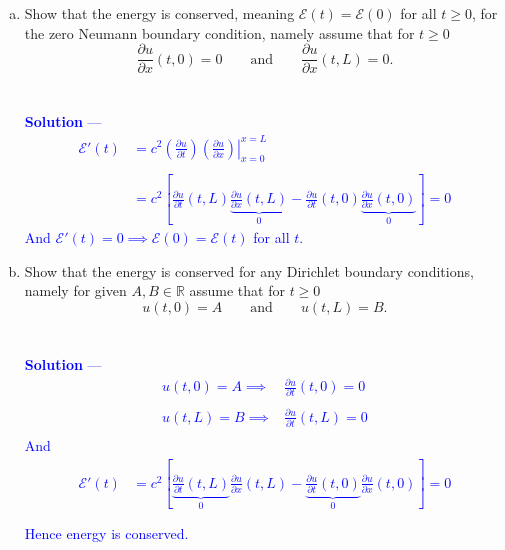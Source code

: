 \documentclass[12pt]{article}
\newcommand{\mcE}{\mathcal{E}}
\begin{document}
\begin{enumerate}[(a)]
\item Show that the energy is conserved, meaning $\mcE(t) = \mcE(0)$ for all $t \geq 0$, for the zero Neumann boundary condition, namely assume that for $t \geq 0$
$$ \frac{\partial u}{\partial x} (t,0) = 0 \qquad \mathrm{and}  \qquad \frac{\partial u}{\partial x} (t,L) = 0.$$ \\ \\ 
\textcolor{blue}{\textbf{Solution} — 
\begin{align*}
\mcE'(t) &= c^2 \left. \left( \frac{\partial u}{\partial t} \right) \left( \frac{\partial u}{\partial x} \right) \right|_{x=0}^{x=L} \\ \\
&=  c^2 \left[ \frac{\partial u}{\partial t} (t, L) \underbrace{\frac{\partial u}{\partial x} (t,L)}_{0} - \frac{\partial u}{\partial t} (t, 0) \underbrace{\frac{\partial u}{\partial x} (t,0)}_{0} \right]  = 0 
\end{align*}
And $\mcE'(t) = 0 \implies \mcE(0) = \mcE(t)$ for all $t$. \\ 
}

\item Show that the energy is conserved for any Dirichlet boundary conditions, namely for given $A,B \in \mathbb{R}$ assume that for $t \geq 0$
$$u(t,0) = A \qquad \mathrm{and} \qquad u(t,L) = B.$$ \\ \\
\textcolor{blue}{\textbf{Solution} — 
\begin{align*}
u(t,0) = A \implies& \frac{\partial u}{\partial t} (t,0) = 0 \\ \\
u(t,L) = B \implies& \frac{\partial u}{\partial t} (t,L) = 0 \\
\end{align*}
And
\begin{align*}
\mcE'(t) &= c^2 \left[ \underbrace{\frac{\partial u}{\partial t} (t, L)}_{0} \frac{\partial u}{\partial x} (t,L) - \underbrace{\frac{\partial u}{\partial t} (t, 0)}_{0} \frac{\partial u}{\partial x} (t,0) \right]  = 0 \\ \\
\end{align*}
Hence energy is conserved.
}



\end{enumerate}
\end{document}
